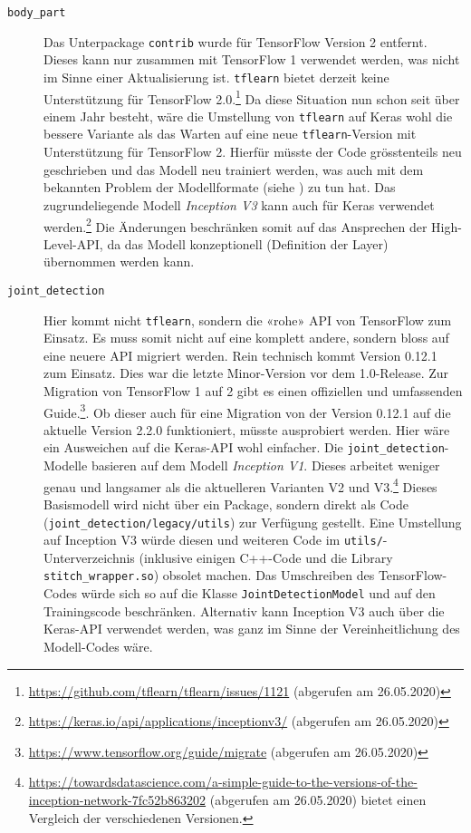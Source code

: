 \begin{description}
    \item [\texttt{body\_part}] Das Unterpackage \texttt{contrib} wurde für TensorFlow Version 2 entfernt. Dieses kann nur zusammen mit TensorFlow 1 verwendet werden, was nicht im Sinne einer Aktualisierung ist. \texttt{tflearn} bietet derzeit keine Unterstützung für TensorFlow 2.0.\footnote{\url{https://github.com/tflearn/tflearn/issues/1121} (abgerufen am 26.05.2020)} Da diese Situation nun schon seit über einem Jahr besteht, wäre die Umstellung von \texttt{tflearn} auf Keras wohl die bessere Variante als das Warten auf eine neue \texttt{tflearn}-Version mit Unterstützung für TensorFlow 2. Hierfür müsste der Code grösstenteils neu geschrieben und das Modell neu trainiert werden, was auch mit dem bekannten Problem der Modellformate (siehe ) zu tun hat. Das zugrundeliegende Modell \textit{Inception V3} kann auch für Keras verwendet werden.\footnote{\url{https://keras.io/api/applications/inceptionv3/} (abgerufen am 26.05.2020)} Die Änderungen beschränken somit auf das Ansprechen der High-Level-API, da das Modell konzeptionell (Definition der Layer) übernommen werden kann.
    \item [\texttt{joint\_detection}] Hier kommt nicht \texttt{tflearn}, sondern die «rohe» API von TensorFlow zum Einsatz. Es muss somit nicht auf eine komplett andere, sondern bloss auf eine neuere API migriert werden. Rein technisch kommt Version 0.12.1 zum Einsatz. Dies war die letzte Minor-Version vor dem 1.0-Release. Zur Migration von TensorFlow 1 auf 2 gibt es einen offiziellen und umfassenden Guide.\footnote{\url{https://www.tensorflow.org/guide/migrate} (abgerufen am 26.05.2020)}. Ob dieser auch für eine Migration von der Version 0.12.1 auf die aktuelle Version 2.2.0 funktioniert, müsste ausprobiert werden. Hier wäre ein Ausweichen auf die Keras-API wohl einfacher. Die \texttt{joint\_detection}-Modelle basieren auf dem Modell \textit{Inception V1}. Dieses arbeitet weniger genau und langsamer als die aktuelleren Varianten V2 und V3.\footnote{\url{https://towardsdatascience.com/a-simple-guide-to-the-versions-of-the-inception-network-7fc52b863202} (abgerufen am 26.05.2020) bietet einen Vergleich der verschiedenen Versionen.} Dieses Basismodell wird nicht über ein Package, sondern direkt als Code (\texttt{joint\_detection/legacy/utils}) zur Verfügung gestellt. Eine Umstellung auf Inception V3 würde diesen und weiteren Code im \texttt{utils/}-Unterverzeichnis (inklusive einigen C++-Code und die Library \texttt{stitch\_wrapper.so}) obsolet machen. Das Umschreiben des TensorFlow-Codes würde sich so auf die Klasse \texttt{JointDetectionModel} und auf den Trainingscode beschränken. Alternativ kann Inception V3 auch über die Keras-API verwendet werden, was ganz im Sinne der Vereinheitlichung des Modell-Codes wäre.

\end{description}
